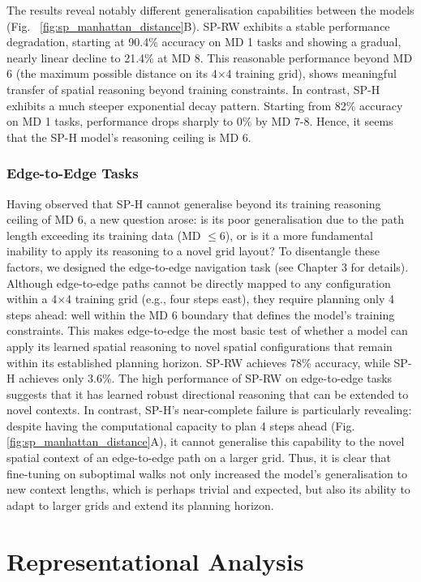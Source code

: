 The results reveal notably different generalisation capabilities between the models (Fig. ~\ref{fig:sp_manhattan_distance}B). SP-RW exhibits a stable performance degradation, starting at 90.4\% accuracy on MD 1 tasks and showing a gradual, nearly linear decline to 21.4\% at MD 8. This reasonable performance beyond MD 6 (the maximum possible distance on its 4×4 training grid), shows meaningful transfer of spatial reasoning beyond training constraints. In contrast, SP-H exhibits a much steeper exponential decay pattern. Starting from 82\% accuracy on MD 1 tasks, performance drops sharply to 0\% by MD 7-8. Hence, it seems that the SP-H model's reasoning ceiling is MD 6.

\subsubsection{Edge-to-Edge Tasks}
Having observed that SP-H cannot generalise beyond its training reasoning ceiling of MD 6, a new question arose: is its poor generalisation due to the path length exceeding its training data (MD $\leq 6$), or is it a more fundamental inability to apply its reasoning to a novel grid layout? To disentangle these factors, we designed the edge-to-edge navigation task (see Chapter 3 for details). Although edge-to-edge paths cannot be directly mapped to any configuration within a 4×4 training grid (e.g., four steps east), they require planning only 4 steps ahead: well within the MD 6 boundary that defines the model's training constraints. This makes edge-to-edge the most basic test of whether a model can apply its learned spatial reasoning to novel spatial configurations that remain within its established planning horizon. SP-RW achieves 78\% accuracy, while SP-H achieves only 3.6\%. The high performance of SP-RW on edge-to-edge tasks suggests that it has learned robust directional reasoning that can be extended to novel contexts. In contrast, SP-H's near-complete failure is particularly revealing: despite having the computational capacity to plan 4 steps ahead (Fig. \ref{fig:sp_manhattan_distance}A), it cannot generalise this capability to the novel spatial context of an edge-to-edge path on a larger grid. Thus, it is clear that fine-tuning on suboptimal walks not only increased the model's generalisation to new context lengths, which is perhaps trivial and expected, but also its ability to adapt to larger grids and extend its planning horizon.


\section{Representational Analysis}

